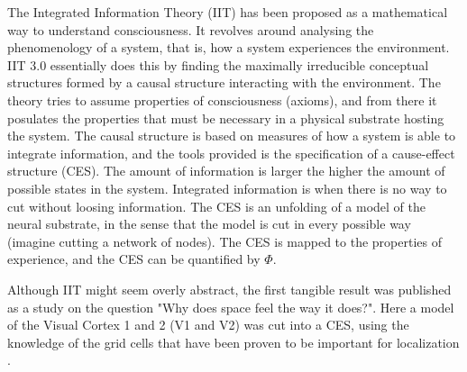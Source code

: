The Integrated Information Theory (IIT) has been proposed as a mathematical way to understand consciousness.
It revolves around analysing the phenomenology of a system, that is, how a system experiences the environment.
IIT 3.0 essentially does this by finding the maximally irreducible conceptual structures formed by a causal structure interacting with the environment.
The theory tries to assume properties of consciousness (axioms), and from there it posulates the properties that must be necessary in a physical substrate hosting the system.
The causal structure is based on measures of how a system is able to integrate information, and the tools provided is the specification of a cause-effect structure (CES).
The amount of information is larger the higher the amount of possible states in the system.
Integrated information is when there is no way to cut without loosing information.
The CES is an unfolding of a model of the neural substrate, in the sense that the model is cut in every possible way (imagine cutting a network of nodes).
The CES is mapped to the properties of experience, and the CES can be quantified by $\Phi$. \cite{oizumi_phenomenology_2014}

Although IIT might seem overly abstract, the first tangible result was published as a study on the question "Why does space feel the way it does?".
Here a model of the Visual Cortex 1 and 2 (V1 and V2) was cut into a CES, using the knowledge of the grid cells that have been proven to be important for localization \cite{haun_why_2019}.

